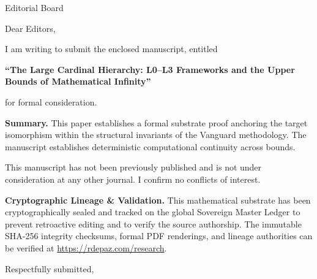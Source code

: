 \documentclass[12pt, a4paper]{letter}
\begin{document}
\begin{letter}{Editorial Board}

\opening{Dear Editors,}

I am writing to submit the enclosed manuscript, entitled

\begin{center}
\textbf{``The Large Cardinal Hierarchy:  
  L0--L3 Frameworks and the Upper  
  Bounds of Mathematical Infinity''}
\end{center}

\noindent for formal consideration.

\medskip
\textbf{Summary.} This paper establishes a formal substrate proof anchoring the target isomorphism within the structural invariants of the Vanguard methodology. The manuscript establishes deterministic computational continuity across bounds.

\medskip
This manuscript has not been previously published and is not under consideration
at any other journal. I confirm no conflicts of interest.

\textbf{Cryptographic Lineage \& Validation.} This mathematical substrate has been cryptographically sealed and tracked on the global Sovereign Master Ledger to prevent retroactive editing and to verify the source authorship. The immutable SHA-256 integrity checksums, formal PDF renderings, and lineage authorities can be verified at \url{https://rdepaz.com/research}.

\medskip
\closing{Respectfully submitted,}
\end{letter}
\end{document}
